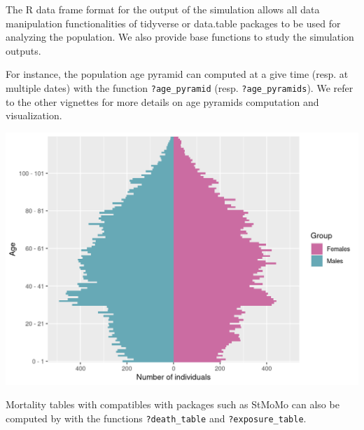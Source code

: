The R data frame format for the output of the simulation allows all data manipulation functionalities of tidyverse or data.table packages to be used for analyzing the population. We also provide base functions to study the simulation outputs.

For instance, the population age pyramid can computed at a give time (resp. at multiple dates) with the function \texttt{?age\_pyramid} (resp. \texttt{?age\_pyramids}). We refer to the other vignettes for more details on age pyramids computation and visualization.

\begin{Shaded}
\begin{Highlighting}[]
\OtherTok{\textless{}{-}}\SpecialCharTok{$}

\OtherTok{\textless{}{-}}  \SpecialCharTok{:} \NormalTok{)}
\end{Highlighting}
\end{Shaded}

\begin{center}\includegraphics{main_plot_30-1} \end{center}

Mortality tables with compatibles with packages such as StMoMo can also be computed by with the functions \texttt{?death\_table} and \texttt{?exposure\_table}.

